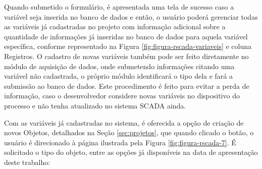 Quando submetido o formulário, é apresentada uma tela de sucesso caso a variável seja inserida no banco de dados e então, o usuário poderá gerenciar todas as variáveis já cadastradas no projeto com informação adicional sobre a quantidade de informações já inseridas no banco de dados para aquela variável específica, conforme representado na Figura \ref{fig:figura-rscada-variaveis} e coluna Registros. O cadastro de novas variáveis também pode ser feito diretamente no módulo de aquisição de dados, onde submetendo informações citando uma variável não cadastrada, o próprio módulo identificará o tipo dela e fará a submissão ao banco de dados. Este procedimento é feito para evitar a perda de informação, caso o desenvolvedor considere novas variáveis no dispositivo do processo e não tenha atualizado no sistema \gls{SCADA} ainda.

        \begin{figure}[!h]
    	\end{figure}

Com as variáveis já cadastradas no sistema, é oferecida a opção de criação de novos Objetos, detalhados na Seção \ref{sec:projetos}, que quando clicado o botão, o usuário é direcionado à página ilustrada pela Figura \ref{fig:figura-rscada-7}. É solicitado o tipo do objeto, entre as opções já disponíveis na data de apresentação deste trabalho:

